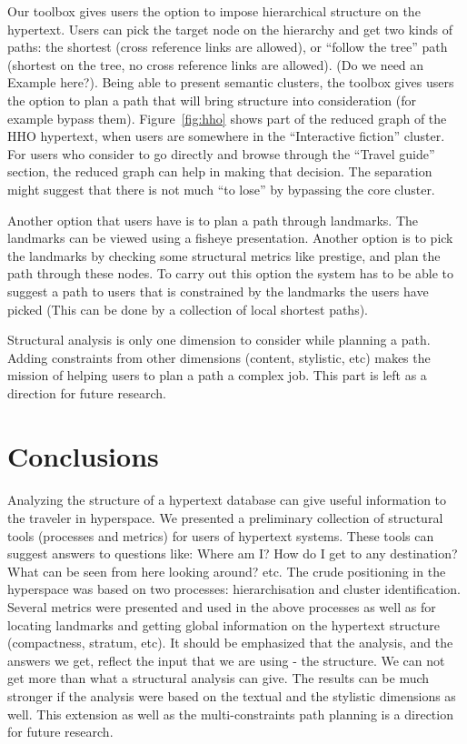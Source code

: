 \documentclass[twocolumn,10pt]{article}
\begin{document}
Our toolbox gives users the option to impose hierarchical structure
on the hypertext. Users can pick the target node on the hierarchy
and get two kinds of paths: the shortest (cross reference links are 
allowed), or ``follow the tree'' path (shortest on the tree, no cross
reference links are allowed). (Do we need an Example here?).
Being able to present semantic clusters, the toolbox gives users
the option to plan a path that will bring structure into consideration
(for example bypass them). Figure~\ref{fig:hho} shows part of the reduced 
graph of the HHO hypertext, when users are somewhere in the ``Interactive
fiction'' cluster. For users who consider to go directly and
browse through the ``Travel guide''  section, the reduced graph can 
help in making that decision. The separation might suggest that there
is not much ``to lose'' by bypassing the core cluster.
 
Another option that users have is to plan a path 
through landmarks. The landmarks can be viewed using a fisheye
presentation. Another option is to pick the landmarks by
checking some structural metrics
like prestige, and plan the path through these nodes.
To carry out this option the system has to be able to suggest a
path to users that is constrained by the landmarks the users
have picked (This can be done by a collection of local shortest
paths). 

Structural analysis is only one dimension to consider while
planning a path. Adding constraints from other dimensions
(content, stylistic, etc) makes the mission of helping
users to plan a path a complex job. This part is left as
a direction for future research.

\section{Conclusions}
\paragraph{}
Analyzing the structure of a hypertext database can give useful
information to the traveler in hyperspace. We presented
a preliminary collection of structural tools (processes and metrics) for users
of hypertext systems. These tools can suggest answers to
questions like: Where am I? How do I get to any destination?
What can be seen from here looking around? etc. 
The crude positioning in the hyperspace was based on
two processes: hierarchisation and cluster identification.
Several metrics were presented and used in the above processes
as well as for locating landmarks and getting global information
on the hypertext structure (compactness, stratum, etc).
It should be emphasized that the analysis, and the
answers we get, reflect the input that we are using - the structure.
We can not get more than what a structural analysis can give. 
The results can be much stronger if the analysis were
based on the textual and the stylistic dimensions as well. This 
extension as well as the multi-constraints path planning is a direction
for future research.
\end{document}
